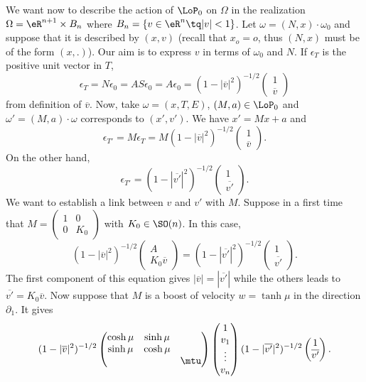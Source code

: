 We want now to describe the action of $\LoP_0$ on $\Omega$ in the realization $\Omega=\eR^{n+1}\times B_n$ where $B_n=\{ v\in\eR^n\tq | v |<1 \}$. Let $\omega=(N,x)\cdot \omega_0$ and suppose that it is described by $(x,v)$ (recall that $x_o=o$, thus $(N,x)$ must be of the form $(x,.)$). Our aim is to express $v$ in terms of $\omega_0$ and $N$. If $\epsilon_T$ is the positive unit vector in $T$,
\begin{equation} \label{eq_epsTv}
	\epsilon_T=N\epsilon_0=AS\epsilon_0=A\epsilon_0=
	(1-|\overline{v}|^2)^{-1/2}
	\begin{pmatrix}
		1 \\\overline{v}
	\end{pmatrix}
\end{equation}
from definition of $\overline{v}$. Now, take $\omega=(x,T,E)$, $(M,a)\in\LoP_0$ and $\omega'=(M,a)\cdot \omega$ corresponds to $(x',v')$. We have $x'=Mx+a$ and
\[
	\epsilon_{T'}=M\epsilon_T=M(1-|\overline{v}|^2)^{-1/2}
	\begin{pmatrix}
		1 \\\overline{v}
	\end{pmatrix}.
\]
On the other hand,
\[
	\epsilon_{T'}=(1-|\overline{v'}|^2)^{-1/2}
	\begin{pmatrix}
		1 \\\overline{v'}
	\end{pmatrix}.
\]
We want to establish a link between $v$ and $v'$ with $M$. Suppose in a first time that
$
	M=
	\begin{pmatrix}
		1 & 0 \\0&K_0
	\end{pmatrix}
$ with $K_0\in \SO(n)$. In this case,
\[
	(1-|\overline{v}|^2)^{-1/2}
	\begin{pmatrix}
		A \\K_0\overline{v}
	\end{pmatrix}
	=(1-|\overline{v'}|^2)^{-1/2}
	\begin{pmatrix}
		1 \\\overline{v'}
	\end{pmatrix}.
\]
The first component of this equation gives $| \overline{v} |=| \overline{v'} |$ while the others leads to $\overline{v'}=K_0\overline{v}$. Now suppose that $M$ is a boost of velocity $w=\tanh\mu$ in the direction $\partial_1$. It gives
\begin{equation} \label{eq_sysumv2}
	(1-|\overline{v}|^2)^{-1/2}
	\begin{pmatrix}
		\cosh\mu & \sinh\mu        \\
		\sinh\mu & \cosh\mu        \\
		         &          & \mtu
	\end{pmatrix}
	\begin{pmatrix}
		1 \\v_1\\\vdots\\v_n
	\end{pmatrix}
	(1-|\overline{v'}|^2)^{-1/2}
	\begin{pmatrix}
		1 \\\overline{v'}
	\end{pmatrix}.
\end{equation}
